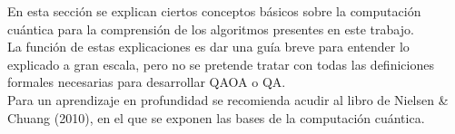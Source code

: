 En esta sección se explican ciertos conceptos básicos sobre la computación cuántica para la comprensión de los algoritmos presentes en este trabajo.
\\
La función de estas explicaciones es dar una guía breve para entender lo explicado a gran escala, pero no se pretende tratar con todas las definiciones formales necesarias para desarrollar QAOA o QA\@.
\\
Para un aprendizaje en profundidad se recomienda acudir al libro de Nielsen \& Chuang (2010)\cite{Nielsen_Chuang_2010}, en el que se exponen las bases de la computación cuántica.




